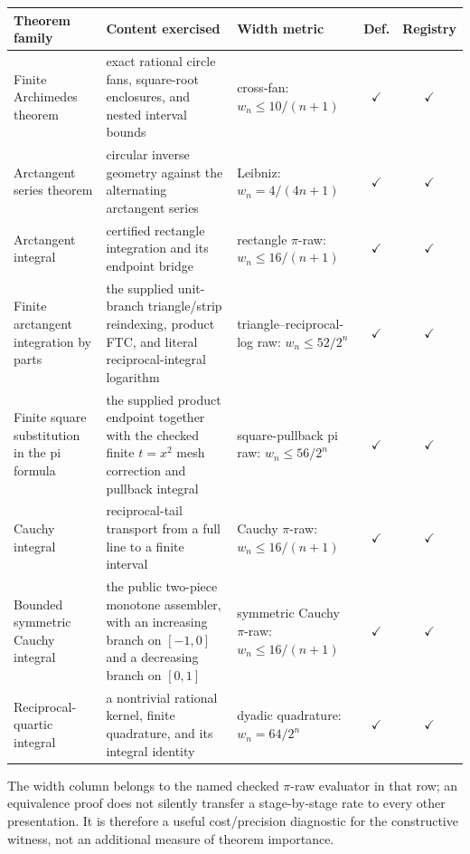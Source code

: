 \begin{center}
\begin{tabular}{@{}p{}p{}p{}cc@{}}
\textbf{Theorem family} & \textbf{Content exercised} &
\textbf{Width metric} & \textbf{Def.} & \textbf{Registry}\\
\hline
Finite Archimedes theorem &
exact rational circle fans, square-root enclosures, and nested interval bounds &
cross-fan: \(w_n\le 10/(n+1)\) &
\(\checkmark\) & \(\checkmark\)\\
Arctangent series theorem &
circular inverse geometry against the alternating arctangent series &
Leibniz: \(w_n=4/(4n+1)\) &
\(\checkmark\) & \(\checkmark\)\\
Arctangent integral &
certified rectangle integration and its endpoint bridge &
rectangle \(\pi\)-raw: \(w_n\le16/(n+1)\) &
\(\checkmark\) & \(\checkmark\)\\
Finite arctangent integration by parts &
the supplied unit-branch triangle/strip reindexing, product FTC, and
literal reciprocal-integral logarithm &
triangle--reciprocal-log raw: \(w_n\le52/2^n\) &
\(\checkmark\) & \(\checkmark\)\\
Finite square substitution in the pi formula &
the supplied product endpoint together with the checked finite
\(t=x^2\) mesh correction and pullback integral &
square-pullback pi raw: \(w_n\le56/2^n\) &
\(\checkmark\) & \(\checkmark\)\\
Cauchy integral &
reciprocal-tail transport from a full line to a finite interval &
Cauchy \(\pi\)-raw: \(w_n\le16/(n+1)\) &
\(\checkmark\) & \(\checkmark\)\\
Bounded symmetric Cauchy integral &
the public two-piece monotone assembler, with an increasing branch on
\([-1,0]\) and a decreasing branch on \([0,1]\) &
symmetric Cauchy \(\pi\)-raw: \(w_n\le16/(n+1)\) &
\(\checkmark\) & \(\checkmark\)\\
Reciprocal-quartic integral &
a nontrivial rational kernel, finite quadrature, and its integral identity &
dyadic quadrature: \(w_n=64/2^n\) &
\(\checkmark\) & \(\checkmark\)\\
\end{tabular}
\end{center}
 
The width column belongs to the named checked \(\pi\)-raw evaluator in that
row; an equivalence proof does not silently transfer a stage-by-stage rate to
every other presentation.  It is therefore a useful cost/precision diagnostic
for the constructive witness, not an additional measure of theorem importance.


